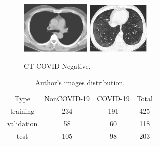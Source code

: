 \documentclass[runningheads]{llncs}
\begin{document}
\begin{figure}[h]
\centering
{
\includegraphics[width=0.30\textwidth]{imagesDatasetSection/noncovid1.jpg}
}
\quad
{
\includegraphics[width=0.27\textwidth]{imagesDatasetSection/noncovid2.jpg}
}
\label{covidNegative}
\caption{CT COVID Negative.}
\end{figure}

\begin{table}[h]
\label{imageDistributionAuthors}
\centering
\caption{Author's images distribution.}
\begin{tabular}{c|c|c|c}
\cline{1-4}
Type & NonCOVID-19 & COVID-19 & Total \\ \cline{1-4}
training & 234 & 191 & 425\\ \cline{1-4}
validation & 58 & 60 & 118\\ \cline{1-4}
test & 105  & 98 & 203\\ \cline{1-4}
\end{tabular}
\end{table} 

\newpage
\end{document}
